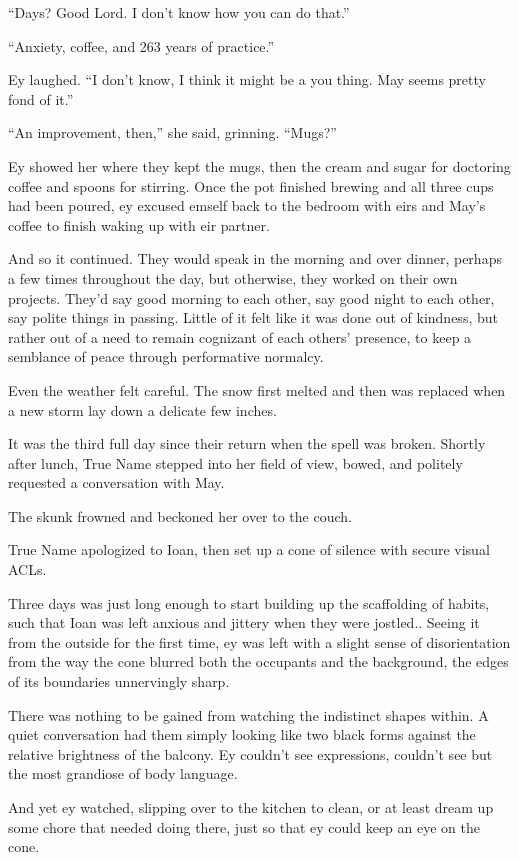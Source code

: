 ``Days? Good Lord. I don't know how you can do that.''

``Anxiety, coffee, and 263 years of practice.''

Ey laughed. ``I don't know, I think it might be a you thing. May seems pretty fond of it.''

``An improvement, then,'' she said, grinning. ``Mugs?''

Ey showed her where they kept the mugs, then the cream and sugar for doctoring coffee and spoons for stirring. Once the pot finished brewing and all three cups had been poured, ey excused emself back to the bedroom with eirs and May's coffee to finish waking up with eir partner.

And so it continued. They would speak in the morning and over dinner, perhaps a few times throughout the day, but otherwise, they worked on their own projects. They'd say good morning to each other, say good night to each other, say polite things in passing. Little of it felt like it was done out of kindness, but rather out of a need to remain cognizant of each others' presence, to keep a semblance of peace through performative normalcy.

Even the weather felt careful. The snow first melted and then was replaced when a new storm lay down a delicate few inches.

It was the third full day since their return when the spell was broken. Shortly after lunch, True Name stepped into her field of view, bowed, and politely requested a conversation with May.

The skunk frowned and beckoned her over to the couch.

True Name apologized to Ioan, then set up a cone of silence with secure visual ACLs.

Three days was just long enough to start building up the scaffolding of habits, such that Ioan was left anxious and jittery when they were jostled.. Seeing it from the outside for the first time, ey was left with a slight sense of disorientation from the way the cone blurred both the occupants and the background, the edges of its boundaries unnervingly sharp.

There was nothing to be gained from watching the indistinct shapes within. A quiet conversation had them simply looking like two black forms against the relative brightness of the balcony. Ey couldn't see expressions, couldn't see but the most grandiose of body language.

And yet ey watched, slipping over to the kitchen to clean, or at least dream up some chore that needed doing there, just so that ey could keep an eye on the cone.

